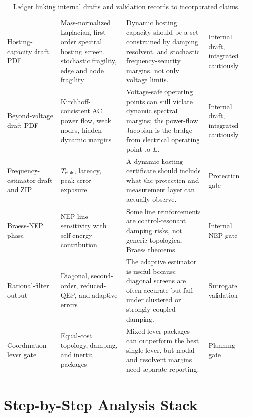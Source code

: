\begin{table}[p]
\centering
\small
\caption{Ledger linking internal drafts and validation records to incorporated
claims.}
\label{tab:source_claim_ledger_validation}
\begin{tabular}{L{0.17\textwidth}L{0.25\textwidth}L{0.30\textwidth}L{0.12\textwidth}}
\toprule
{}
 &  &  & \\
\midrule
Hosting-capacity draft PDF &
Mass-normalized Laplacian, first-order spectral hosting screen, stochastic fragility,
edge and node fragility &
Dynamic hosting capacity should be a set constrained by damping, resolvent,
and stochastic frequency-security margins, not only voltage limits. &
Internal draft, integrated cautiously\\
\addlinespace
Beyond-voltage draft PDF &
Kirchhoff-consistent AC power flow, weak nodes, hidden dynamic margins &
Voltage-safe operating points can still violate dynamic spectral margins; the
power-flow Jacobian is the bridge from electrical operating point to \(L\). &
Internal draft, integrated cautiously\\
\addlinespace
Frequency-estimator draft and ZIP &
\(T_{\rm risk}\), latency, peak-error exposure &
A dynamic hosting certificate should include what the protection and
measurement layer can actually observe. &
Protection gate\\
\addlinespace
Braess-NEP phase &
NEP line sensitivity with self-energy contribution &
Some line reinforcements are control-resonant damping risks, not generic
topological Braess theorems. &
Internal NEP gate\\
\addlinespace
Rational-filter output &
Diagonal, second-order, reduced-QEP, and adaptive errors &
The adaptive estimator is useful because diagonal screens are often accurate
but fail under clustered or strongly coupled damping. &
Surrogate validation\\
\addlinespace
Coordination-lever gate &
Equal-cost topology, damping, and inertia packages &
Mixed lever packages can outperform the best single lever, but modal and
resolvent margins need separate reporting. &
Planning gate\\
\bottomrule
\end{tabular}
\end{table}

\FloatBarrier

\section{Step-by-Step Analysis Stack}

